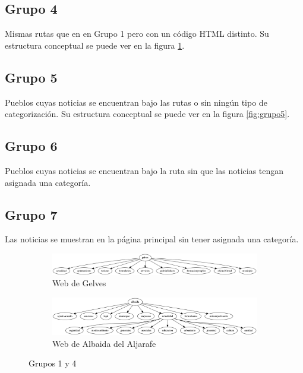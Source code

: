 \subsection*{Grupo 4}
Mismas rutas que en en Grupo 1 pero con un código HTML distinto. Su estructura conceptual se puede ver en la figura \ref{fig:grupo14}.
\subsection*{Grupo 5}
Pueblos cuyas noticias se encuentran bajo las rutas \textit{} o \textit{} sin ningún tipo de categorización. Su estructura conceptual se puede ver en la figura \ref{fig:grupo5}.
\subsection*{Grupo 6}

Pueblos cuyas noticias se encuentran bajo la ruta \textit{} sin que las noticias tengan asignada una categoría.

\subsection*{Grupo 7}
Las noticias se muestran en la página principal sin tener asignada una categoría. 
\begin{figure}

\begin{subfigure}[b]{0.5\textwidth}
\includegraphics[scale=0.45]{trabajo_previo/Gelves.png}
\caption{Web de Gelves}
\end{subfigure}

\begin{subfigure}[b]{0.5\textwidth}
\includegraphics[scale=0.5]{trabajo_previo/Albaida_del_aljarafe.png}
\caption{Web de Albaida del Aljarafe}
\end{subfigure}
\caption{Grupos 1 y 4}
\label{fig:grupo14}
\end{figure}


